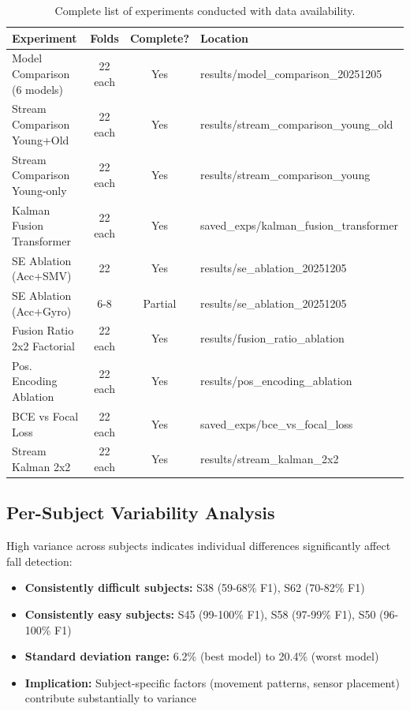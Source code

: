 \documentclass{article}
\begin{document}
\begin{table}[htbp]
    \centering
    \caption{Complete list of experiments conducted with data availability.}
    \label{tab:experiment_inventory}
    \small
    \begin{tabular}{lccl}
        \toprule
        \textbf{Experiment} & \textbf{Folds} & \textbf{Complete?} & \textbf{Location} \\
        \midrule
        Model Comparison (6 models) & 22 each & Yes & results/model\_comparison\_20251205 \\
        Stream Comparison Young+Old & 22 each & Yes & results/stream\_comparison\_young\_old \\
        Stream Comparison Young-only & 22 each & Yes & results/stream\_comparison\_young \\
        Kalman Fusion Transformer & 22 each & Yes & saved\_exps/kalman\_fusion\_transformer \\
        SE Ablation (Acc+SMV) & 22 & Yes & results/se\_ablation\_20251205 \\
        SE Ablation (Acc+Gyro) & 6-8 & Partial & results/se\_ablation\_20251205 \\
        Fusion Ratio 2x2 Factorial & 22 each & Yes & results/fusion\_ratio\_ablation \\
        Pos. Encoding Ablation & 22 each & Yes & results/pos\_encoding\_ablation \\
        BCE vs Focal Loss & 22 each & Yes & saved\_exps/bce\_vs\_focal\_loss \\
        Stream Kalman 2x2 & 22 each & Yes & results/stream\_kalman\_2x2 \\
        \bottomrule
    \end{tabular}
\end{table}

\subsection{Per-Subject Variability Analysis}

High variance across subjects indicates individual differences significantly affect fall detection:

\begin{itemize}
    \item \textbf{Consistently difficult subjects:} S38 (59-68\% F1), S62 (70-82\% F1)
    \item \textbf{Consistently easy subjects:} S45 (99-100\% F1), S58 (97-99\% F1), S50 (96-100\% F1)
    \item \textbf{Standard deviation range:} 6.2\% (best model) to 20.4\% (worst model)
    \item \textbf{Implication:} Subject-specific factors (movement patterns, sensor placement) contribute substantially to variance
\end{itemize}
\end{document}
